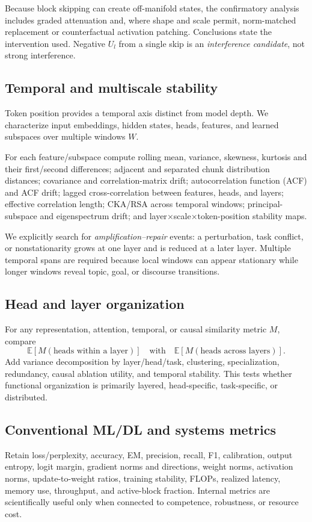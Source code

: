 \documentclass[10pt]{article}
\begin{document}
Because block skipping can create off-manifold states, the confirmatory analysis includes graded attenuation and, where shape and scale permit, norm-matched replacement or counterfactual activation patching. Conclusions state the intervention used. Negative $U_l$ from a single skip is an \emph{interference candidate}, not strong interference.

\subsection{Temporal and multiscale stability}
Token position provides a temporal axis distinct from model depth. We characterize input embeddings, hidden states, heads, features, and learned subspaces over multiple windows $W$.

For each feature/subspace compute rolling mean, variance, skewness, kurtosis and their first/second differences; adjacent and separated chunk distribution distances; covariance and correlation-matrix drift; autocorrelation function (ACF) and ACF drift; lagged cross-correlation between features, heads, and layers; effective correlation length; CKA/RSA across temporal windows; principal-subspace and eigenspectrum drift; and layer$\times$scale$\times$token-position stability maps.

We explicitly search for \emph{amplification--repair} events: a perturbation, task conflict, or nonstationarity grows at one layer and is reduced at a later layer. Multiple temporal spans are required because local windows can appear stationary while longer windows reveal topic, goal, or discourse transitions.

\subsection{Head and layer organization}
For any representation, attention, temporal, or causal similarity metric $M$, compare
\[
\mathbb{E}[M(\text{heads within a layer})]
\quad\text{with}\quad
\mathbb{E}[M(\text{heads across layers})].
\]
Add variance decomposition by layer/head/task, clustering, specialization, redundancy, causal ablation utility, and temporal stability. This tests whether functional organization is primarily layered, head-specific, task-specific, or distributed.

\subsection{Conventional ML/DL and systems metrics}
Retain loss/perplexity, accuracy, EM, precision, recall, F1, calibration, output entropy, logit margin, gradient norms and directions, weight norms, activation norms, update-to-weight ratios, training stability, FLOPs, realized latency, memory use, throughput, and active-block fraction. Internal metrics are scientifically useful only when connected to competence, robustness, or resource cost.
\end{document}
